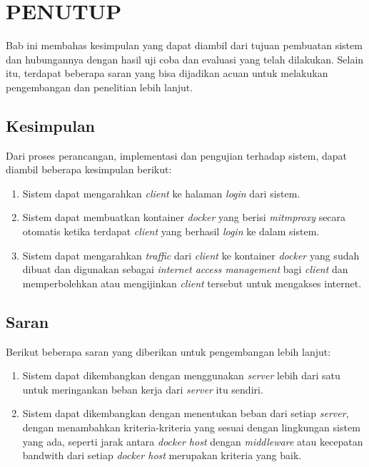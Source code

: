\chapter{PENUTUP}
    Bab ini membahas kesimpulan yang dapat diambil dari tujuan pembuatan sistem dan hubungannya dengan hasil uji coba dan evaluasi yang telah dilakukan. Selain itu, terdapat beberapa saran yang bisa dijadikan acuan untuk melakukan pengembangan dan penelitian lebih lanjut.
        
\section{Kesimpulan}
Dari proses perancangan, implementasi dan pengujian terhadap sistem, dapat diambil beberapa kesimpulan berikut:
\begin{enumerate}
\item Sistem dapat mengarahkan \textit{client} ke halaman \textit{login} dari sistem.
\item Sistem dapat membuatkan kontainer \textit{docker} yang berisi \textit{mitmproxy} secara otomatis ketika terdapat \textit{client} yang berhasil \textit{login} ke dalam sistem.
\item Sistem dapat mengarahkan \textit{traffic} dari \textit{client} ke kontainer \textit{docker} yang sudah dibuat dan digunakan sebagai \textit{internet access management} bagi \textit{client} dan memperbolehkan atau mengijinkan \textit{client} tersebut untuk mengakses internet. 
\end{enumerate}

\section{Saran}
Berikut beberapa saran yang diberikan untuk pengembangan lebih lanjut:
\begin{enumerate}
\item Sistem dapat dikembangkan dengan menggunakan \textit{server} lebih dari satu untuk meringankan beban kerja dari \textit{server} itu sendiri.
\item Sistem dapat dikembangkan dengan menentukan beban dari setiap \textit{server}, dengan menambahkan kriteria-kriteria yang sesuai dengan lingkungan sistem yang ada, seperti jarak antara \textit{docker host} dengan \textit{middleware} atau kecepatan bandwith dari setiap \textit{docker host} merupakan kriteria yang baik. 
\end{enumerate}